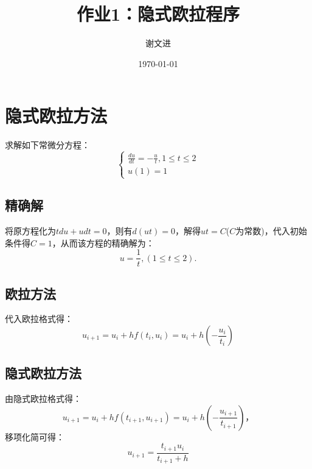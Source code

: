 \documentclass{ctexart}
\title{作业1：隐式欧拉程序}
\author{谢文进}
\date{\today}
\begin{document}
\maketitle
\section{隐式欧拉方法}
求解如下常微分方程：
\begin{equation} \label{eq_arry}%
    \begin{cases}
        \frac{du}{dt}=-\frac{u}{t},1\leq t\leq 2\\
        u(1)=1
    \end{cases}	
\end{equation}
\subsection{精确解}
将原方程化为$tdu+udt=0$，则有$d(ut)=0$，解得$ut=C$($C$为常数)，代入初始条件得$C=1$，从而该方程的精确解为：
\begin{displaymath}
    u=\frac{1}{t},(1\leq t \leq2).
\end{displaymath}
\subsection{欧拉方法}
代入欧拉格式得：
\begin{displaymath}
    u_{i+1}=u_{i}+hf(t_i,u_i)=u_i+h(-\frac{u_i}{t_i})
\end{displaymath}
\subsection{隐式欧拉方法}
由隐式欧拉格式得：
\begin{displaymath}
    u_{i+1}=u_{i}+hf(t_{i+1},u_{i+1})=u_i+h(-\frac{u_{i+1}}{t_{i+1}})，
\end{displaymath}
移项化简可得：
\begin{displaymath}
    u_{i+1}=\frac{t_{i+1}u_i}{t_{i+1}+h}
\end{displaymath}
\end{document}
